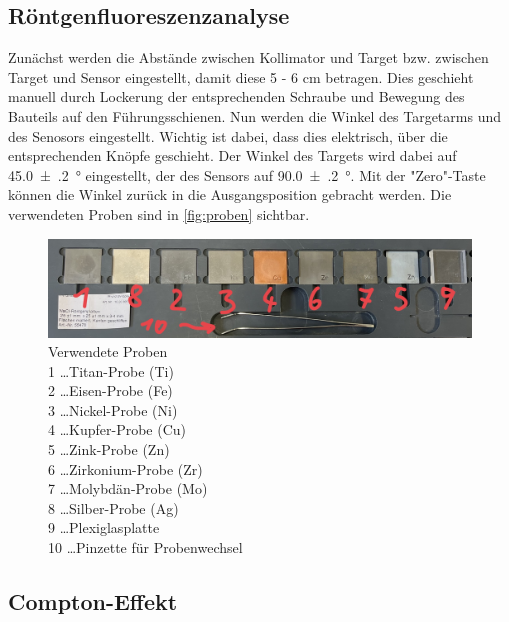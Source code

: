 \documentclass[12pt,english,ngerman]{scrartcl}
\begin{document}
\subsection{Röntgenfluoreszenzanalyse}

Zunächst werden die Abstände zwischen Kollimator und Target bzw. zwischen Target und Sensor eingestellt, damit diese 
5 - 6 cm betragen. Dies geschieht manuell durch Lockerung der entsprechenden Schraube und Bewegung des Bauteils auf den
Führungsschienen.
Nun werden die Winkel des Targetarms und 
des Senosors eingestellt. Wichtig ist dabei, dass dies elektrisch, über die entsprechenden Knöpfe geschieht.
Der Winkel des Targets wird dabei auf \SI{45.0(2)}{\degree} eingestellt, der des Sensors auf \SI{90.0(2)}{\degree}.
Mit der "Zero"-Taste können die Winkel zurück in die Ausgangsposition gebracht werden.
Die verwendeten Proben sind in \autoref{fig:proben} sichtbar.

\begin{figure}[H]
	\begin{center}
		\includegraphics[width =\textwidth]{./figures/proben.jpg}
	\end{center}
	\caption[Verwendete Proben]
	{Verwendete Proben\\
	1 \dots Titan-Probe (Ti)\\
	2 \dots Eisen-Probe (Fe) \\
	3 \dots Nickel-Probe (Ni)\\
	4 \dots Kupfer-Probe (Cu)\\
	5 \dots Zink-Probe (Zn)\\
	6 \dots Zirkonium-Probe (Zr)\\
	7 \dots Molybdän-Probe (Mo)\\
	8 \dots Silber-Probe (Ag)\\
	9 \dots Plexiglasplatte \\
	10 \dots Pinzette für Probenwechsel
	}\label{fig:proben}
\end{figure}

\subsection{Compton-Effekt}
\end{document}
